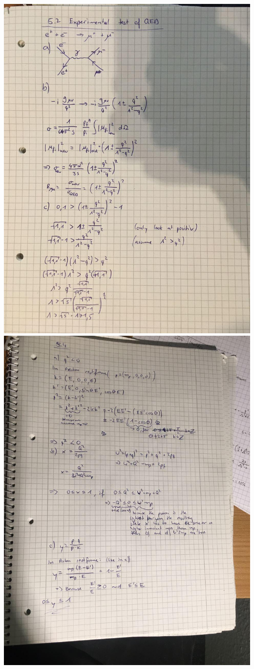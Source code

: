 \documentclass{article}
\begin{document}
    
    \includegraphics[width=\textwidth]{5-2.jpg}\\
    \includegraphics[width=\textwidth]{5-4.jpg}
\end{document}
